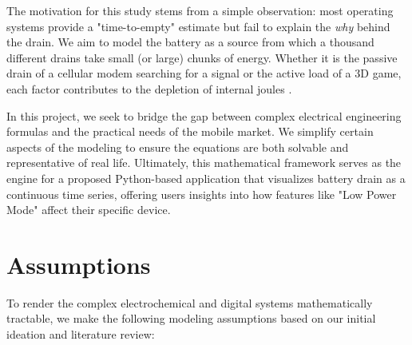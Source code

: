 \documentclass[12pt]{article}
\begin{document}
The motivation for this study stems from a simple observation: most operating systems provide a "time-to-empty" estimate but fail to explain the \textit{why} behind the drain. We aim to model the battery as a source from which a thousand different drains take small (or large) chunks of energy. Whether it is the passive drain of a cellular modem searching for a signal or the active load of a 3D game, each factor contributes to the depletion of internal joules \cite{14}.

In this project, we seek to bridge the gap between complex electrical engineering formulas and the practical needs of the mobile market. We simplify certain aspects of the modeling to ensure the equations are both solvable and representative of real life. Ultimately, this mathematical framework serves as the engine for a proposed Python-based application that visualizes battery drain as a continuous time series, offering users insights into how features like "Low Power Mode" affect their specific device.

\section{Assumptions}

To render the complex electrochemical and digital systems mathematically tractable, we make the following modeling assumptions based on our initial ideation and literature review:
\end{document}
